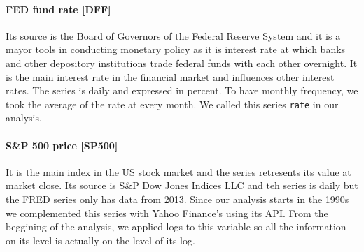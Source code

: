 \documentclass[hidelinks,12pts]{article}
\DeclareMathOperator{\1}{\mathbbm{1}}
\begin{document}


\paragraph{FED fund rate [DFF]}
Its source is the Board of Governors of the Federal Reserve System and it is a mayor tools in conducting monetary policy as it is interest rate at which banks and other depository institutions trade federal funds with each other overnight.
It is the main interest rate in the financial market and influences other interest rates.
The series is daily and expressed in percent. 
To have monthly frequency, we took the average of the rate at every month.
We called this series \texttt{rate} in our analysis.


\paragraph{S\&P 500 price [SP500]} %
It is the main index in the US stock market and the series retresents its value at market close.
Its source is S\&P Dow Jones Indices LLC and teh series is daily but the FRED series only has data from 2013. 
Since our analysis starts in the 1990s we complemented this series with Yahoo Finance's using its API. 
From the beggining of the analysis, we applied logs to this variable so all the information on its level is actually on the level of its log.
\end{document}
